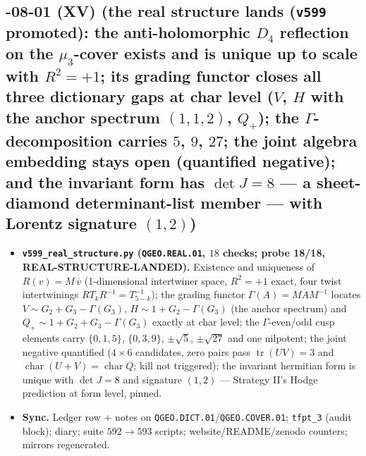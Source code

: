 \documentclass[11pt]{article}
\begin{document}
\subsection*{-08-01 (XV) (the real structure lands (\texttt{v599} promoted): the anti-holomorphic $D_4$ reflection on the $\mu_3$-cover exists and is unique up to scale with $R^2=+1$; its grading functor closes all three dictionary gaps at char level ($V$, $H$ with the anchor spectrum $(1,1,2)$, $Q_+$); the $\Gamma$-decomposition carries $5$, $9$, $27$; the joint algebra embedding stays open (quantified negative); and the invariant form has $\det J=8$ --- a sheet-diamond determinant-list member --- with Lorentz signature $(1,2)$)}
\begin{itemize}[leftmargin=1.5em]
\item \textbf{\texttt{v599\_real\_structure.py} (\texttt{QGEO.REAL.01}, $18$ checks; probe
18/18, REAL-STRUCTURE-LANDED).} Existence and uniqueness of $R(v)=M\,\overline{v}$
(1-dimensional intertwiner space, $R^2=+1$ exact, four twist intertwinings
$RT_kR^{-1}=T_{5-k}^{-1}$); the grading functor $\Gamma(A)=M\overline{A}M^{-1}$ locates
$V\sim G_2+G_3-\Gamma(G_3)$, $H\sim 1+G_2-\Gamma(G_3)$ (the anchor spectrum) and
$Q_+\sim 1+G_2+G_3-\Gamma(G_3)$ exactly at char level; the $\Gamma$-even/odd cusp elements
carry $\{0,1,5\}$, $\{0,3,9\}$, $\pm\sqrt5$, $\pm\sqrt{27}$ and one nilpotent; the joint
negative quantified ($4\times6$ candidates, zero pairs pass $\operatorname{tr}(UV)=3$ and
$\operatorname{char}(U+V)=\operatorname{char}Q$; kill not triggered); the invariant hermitian
form is unique with $\det J=8$ and signature $(1,2)$ --- Strategy II's Hodge prediction at
form level, pinned.
\item \textbf{Sync.} Ledger row + notes on \texttt{QGEO.DICT.01}/\texttt{QGEO.COVER.01};
\texttt{tfpt\_3} (audit block); diary; suite $592\to593$ scripts; website/README/zenodo
counters; mirrors regenerated.
\end{itemize}
\end{document}
